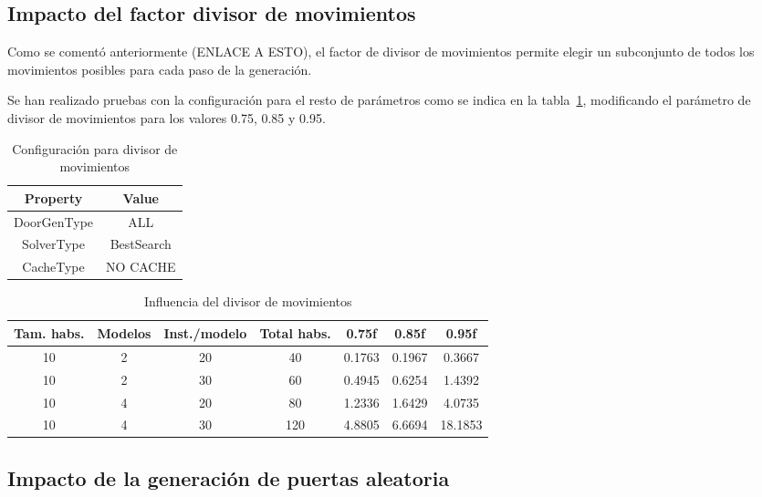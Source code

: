 \subsection{Impacto del factor divisor de movimientos}

Como se comentó anteriormente (ENLACE A ESTO), el factor de divisor de movimientos permite elegir un subconjunto de todos los movimientos posibles para cada paso de la generación.

Se han realizado pruebas con la configuración para el resto de parámetros como se indica en la tabla~\ref{table:cfgdpediv}, modificando el parámetro de divisor de movimientos para los valores 0.75, 0.85 y 0.95.

\begin{table}[H]
\begin{center}
	\begin{tabular}{ | c | c | }
\hline
 		Property & Value \\ \hline
DoorGenType & ALL \\ 
SolverType & BestSearch \\ 
CacheType & NO CACHE \\ 
\hline
	\end{tabular}
\end{center}
\caption{Configuración para divisor de movimientos}
\label{table:cfgdpediv}
\end{table}

\begin{table}[H]
\begin{center}
	\begin{tabular}{ | c | c | c | c | c | c | c | }
\hline
Tam. habs. & Modelos & Inst./modelo & Total habs. & 0.75f & 0.85f & 0.95f\\ \hline 
10 & 2 & 20 & 40 & 0.1763 & 0.1967 & 0.3667 \\ 
10 & 2 & 30 & 60 & 0.4945 & 0.6254 & 1.4392 \\ 
10 & 4 & 20 & 80 & 1.2336 & 1.6429 & 4.0735 \\ 
10 & 4 & 30 & 120 & 4.8805 & 6.6694 & 18.1853 \\ 
\hline
	\end{tabular}
\end{center}
\caption{Influencia del divisor de movimientos}
\label{table:dpediv}
\end{table}



\subsection{Impacto de la generación de puertas aleatoria}

